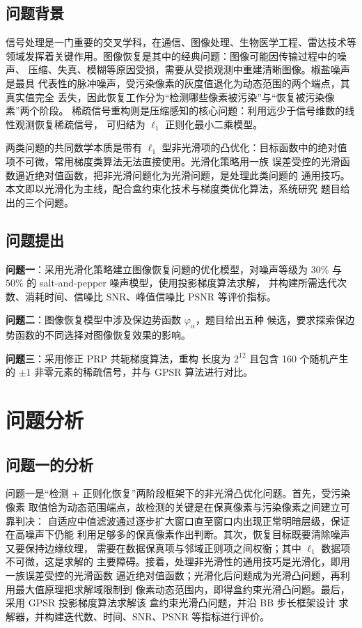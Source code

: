 \documentclass[withoutpreface,bwprint]{cumcmthesis}
\begin{document}
\subsection{问题背景}

信号处理是一门重要的交叉学科，在通信、图像处理、生物医学工程、雷达技术等
领域发挥着关键作用。图像恢复是其中的经典问题：图像可能因传输过程中的噪声、
压缩、失真、模糊等原因受损，需要从受损观测中重建清晰图像。椒盐噪声是最具
代表性的脉冲噪声，受污染像素的灰度值退化为动态范围的两个端点，其真实值完全
丢失，因此恢复工作分为``检测哪些像素被污染''与``恢复被污染像素''两个阶段\cite{chan2005}。
稀疏信号重构则是压缩感知的核心问题：利用远少于信号维数的线性观测恢复稀疏信号，
可归结为 $\ell_1$ 正则化最小二乘模型\cite{figueiredo2008}。

两类问题的共同数学本质是带有 $\ell_1$ 型非光滑项的凸优化：目标函数中的绝对值
项不可微，常用梯度类算法无法直接使用。光滑化策略\cite{wu2021,chen2010}用一族
误差受控的光滑函数逼近绝对值函数，把非光滑问题化为光滑问题，是处理此类问题的
通用技巧。本文即以光滑化为主线，配合盒约束化技术与梯度类优化算法，系统研究
题目给出的三个问题。

\subsection{问题提出}

\textbf{问题一}：采用光滑化策略建立图像恢复问题的优化模型，对噪声等级为
$30\%$ 与 $50\%$ 的 salt-and-pepper 噪声模型，使用投影梯度算法求解，
并构建所需迭代次数、消耗时间、信噪比 SNR、峰值信噪比 PSNR 等评价指标。

\textbf{问题二}：图像恢复模型中涉及保边势函数 $\varphi_{\alpha}$，题目给出五种
候选，要求探索保边势函数的不同选择对图像恢复效果的影响。

\textbf{问题三}：采用修正 PRP 共轭梯度算法，重构
长度为 $2^{12}$ 且包含 160 个随机产生的 $\pm1$ 非零元素的稀疏信号，并与
GPSR 算法进行对比。

\section{问题分析}

\subsection{问题一的分析}

问题一是``检测 + 正则化恢复''两阶段框架下的非光滑凸优化问题。首先，受污染像素
取值恰为动态范围端点，故检测的关键是在保真像素与污染像素之间建立可靠判决：
自适应中值滤波通过逐步扩大窗口直至窗口内出现正常明暗层级，保证在高噪声下仍能
利用足够多的保真像素作出判断。其次，恢复目标既要清除噪声又要保持边缘纹理，
需要在数据保真项与邻域正则项之间权衡；其中 $\ell_1$ 数据项不可微，这是求解的
主要障碍。接着，处理非光滑性的通用技巧是光滑化，即用一族误差受控的光滑函数
逼近绝对值函数；光滑化后问题成为光滑凸问题，再利用最大值原理把求解域限制到
像素动态范围内，即得盒约束光滑凸问题。最后，采用 GPSR 投影梯度算法求解该
盒约束光滑凸问题，并沿 BB 步长框架设计
求解器，并构建迭代数、时间、SNR、PSNR 等指标进行评价。
\end{document}
